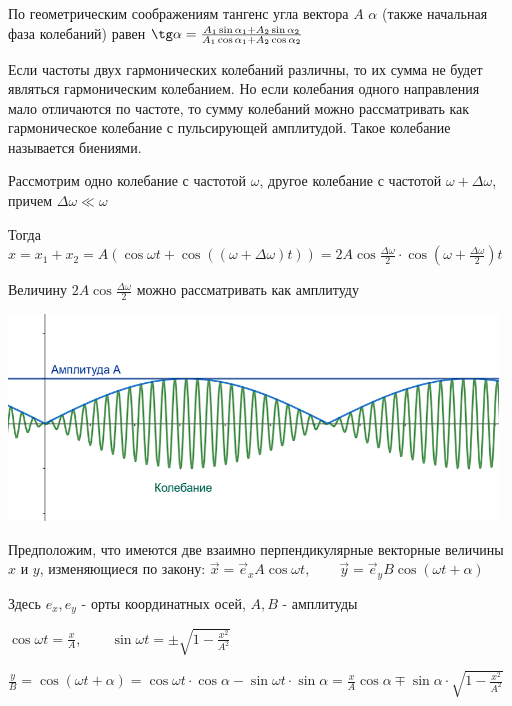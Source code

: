 \documentclass[12pt]{article}
\begin{document}
По геометрическим соображениям тангенс угла вектора $A$ $\alpha$ (также начальная фаза колебаний) равен 
$\tg \alpha = \frac{A_1 \sin \alpha_1 + A_2 \sin \alpha_2}{A_1 \cos \alpha_1 + A_2 \cos \alpha_2}$

Если частоты двух гармонических колебаний различны, то их сумма не будет являться гармоническим колебанием.
Но если колебания одного направления мало отличаются по частоте, то сумму колебаний можно рассматривать
как гармоническое колебание с пульсирующей амплитудой. Такое колебание называется биениями.

Рассмотрим одно колебание с частотой $\omega$, другое колебание с частотой $\omega + \Delta \omega$, причем $\Delta \omega \ll \omega$

Тогда $x = x_1 + x_2 = A (\cos \omega t + \cos ((\omega + \Delta \omega) t)) = 2 A \cos \frac{\Delta \omega}{2} \cdot 
\cos \left(\omega + \frac{\Delta \omega}{2}\right) t $

Величину $2 A \cos \frac{\Delta \omega}{2}$ можно рассматривать как амплитуду


\begin{center}
    \includegraphics[width=13cm]{physics2/images/physics2_2025_03_17_2}
\end{center}

Предположим, что имеются две взаимно перпендикулярные векторные величины $x$ и $y$, изменяющиеся по закону:
$\vec x = \vec e_x A \cos \omega t, \qquad \vec y = \vec e_y B \cos (\omega t + \alpha)$

Здесь $e_x, e_y$ - орты координатных осей, $A, B$ - амплитуды

$\cos \omega t = \frac{x}{A}, \qquad \sin \omega t = \pm \sqrt{1 - \frac{x^2}{A^2}}$

$\frac{y}{B} = \cos (\omega t + \alpha) = \cos \omega t \cdot \cos \alpha - \sin \omega t \cdot \sin \alpha = 
\frac{x}{A} \cos \alpha \mp \sin \alpha \cdot \sqrt{1 - \frac{x^2}{A^2}}$
\end{document}
